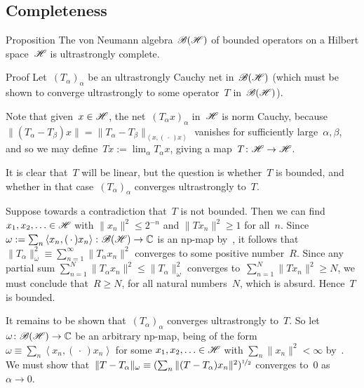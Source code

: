 \documentclass[a]{subfiles}
\begin{document}
\subsection{Completeness}
\begin{parsec}%
\begin{point}[bh-us-complete]{Proposition}%
The von Neumann algebra~$\mathscr{B}(\mathscr{H})$
of bounded operators on a Hilbert space~$\mathscr{H}$
is ultrastrongly complete.
\begin{point}{Proof}
Let~$(T_\alpha)_\alpha$ be an ultrastrongly Cauchy net
in~$\mathscr{B}(\mathscr{H})$
(which must be shown to converge ultrastrongly to
some operator~$T$ in~$\mathscr{B}(\mathscr{H})$).

Note that given~$x\in \mathscr{H}$,
the net~$(T_\alpha x)_\alpha$ in~$\mathscr{H}$
is norm Cauchy,
because $\|(T_\alpha-T_\beta) x\|
= \| T_\alpha-T_\beta \|_{\left<x,(\,\cdot\,)x\right>}$
vanishes for sufficiently large~$\alpha,\beta$,
and so we may define~$Tx :=\lim_\alpha T_\alpha x$,
giving a map~$T\colon \mathscr{H}\to\mathscr{H}$.

It is clear that~$T$ will be linear,
but the question is whether~$T$ is bounded,
and whether in that 
case~$(T_\alpha)_\alpha$ converges ultrastrongly to~$T$.

Suppose towards a contradiction that~$T$ is not bounded.
Then we can find~$x_1,x_2,\dotsc\in\mathscr{H}$
with $\|x_n\|^2\leq 2^{-n}$
and $\|Tx_n\|^2\geq 1$ for all~$n$.
Since~$\omega:=\sum_n \left<x_n,(\,\cdot\,)x_n\right>\colon 
\mathscr{B}(\mathscr{H})\to\mathbb{C}$
is an np-map by~, 
it follows that~$\|T_\alpha\|_\omega^2\equiv \sum_{n=1}^\infty 
\|T_\alpha x_n\|^2$
converges to some positive number~$R$.
Since any partial sum $\sum_{n=1}^N \|T_\alpha x_n\|^2
\leq \|T_\alpha\|_\omega^2$
converges to~$\sum_{n=1}^N \|T x_n\|^2\geq N$,
we must conclude that~$R\geq N$,
for all natural numbers~$N$,
which is absurd.
Hence~$T$ is bounded.

It remains to be shown that~$(T_\alpha)_\alpha$
converges ultrastrongly to~$T$.
So let $\omega\colon \mathscr{B}(\mathscr{H})\to\mathbb{C}$ be an arbitrary
np-map,
being of the form~$\omega\equiv \sum_n\left<x_n,(\,\cdot\,)x_n\right>$
for some $x_1,x_2,\dotsc\in\mathscr{H}$ with $\sum_n \|x_n\|^2 <\infty$
by~.
We must show that~$\|T-T_\alpha\|_\omega
\equiv (\sum_n \|(T-T_\alpha)x_n\|^2)^{\nicefrac{1}{2}}$ 
converges to~$0$ as $\alpha\to 0$.


\end{point}
\end{point}
\end{parsec}
\end{document}
